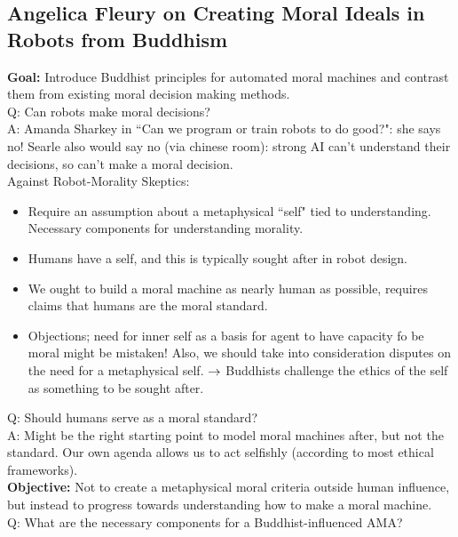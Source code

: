 \spacerule
\subsection{Angelica Fleury on Creating Moral Ideals in Robots from Buddhism}


{\bf Goal:} Introduce Buddhist principles for automated moral machines and contrast them from existing moral decision making methods. \\

Q: Can robots make moral decisions? \\

A: Amanda Sharkey in ``Can we program or train robots to do good?": she says no! Searle also would say no (via chinese room): strong AI can't understand their decisions, so can't make a moral decision. \\

Against Robot-Morality Skeptics:
\begin{itemize}
\item Require an assumption about a metaphysical ``self" tied to understanding. Necessary components for understanding morality.
\item Humans have a self, and this is typically sought after in robot design.
\item We ought to build a moral machine as nearly human as possible, requires claims that humans are the moral standard.
\item Objections; need for inner self as a basis for agent to have capacity fo be moral might be mistaken! Also, we should take into consideration disputes on the need for a metaphysical self.
$\rightarrow$ Buddhists challenge the ethics of the self as something to be sought after.
\end{itemize}


Q: Should humans serve as a moral standard? \\

A: Might be the right starting point to model moral machines after, but not the standard. Our own agenda allows us to act selfishly (according to most ethical frameworks). \\

{\bf Objective:} Not to create a metaphysical moral criteria outside human influence, but instead to progress towards understanding how to make a moral machine. \\

Q: What are the necessary components for a Buddhist-influenced AMA?

